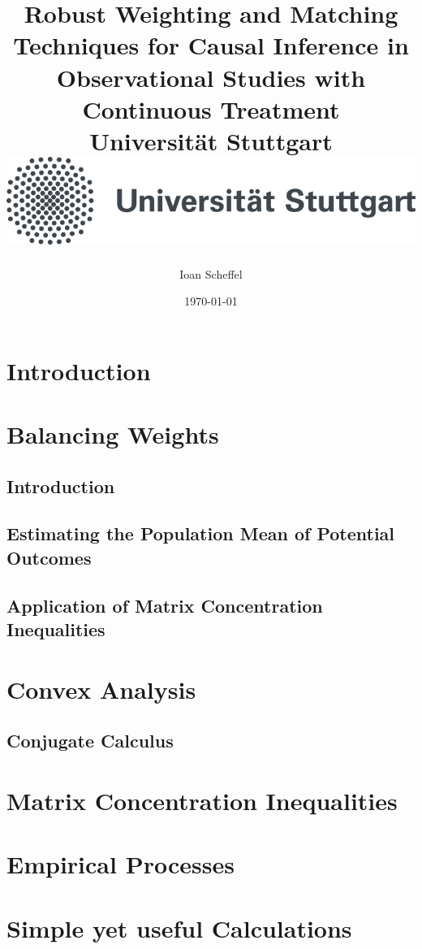 \documentclass[12pt]{scrreport}
\title{
  {
    Robust Weighting and Matching Techniques for Causal Inference in Observational Studies with Continuous Treatment
  }
  \\
  {\large Universität Stuttgart}
  \\
  {\includegraphics{unistuttgart_logo_deutsch.jpg}}
}
\author{Ioan Scheffel}
\date{\today}
\begin{document}
\maketitle

\tableofcontents 

\chapter{Introduction}


\chapter{Balancing Weights}
  \section{Introduction}
  
  \section{Estimating the Population Mean of Potential Outcomes}
  \section{Application of Matrix Concentration Inequalities}
  
\chapter{Convex Analysis}
  \section{Conjugate Calculus}
  
%

\chapter{Matrix Concentration Inequalities}


\chapter{Empirical Processes}


\chapter{Simple yet useful Calculations} 



\printnomenclature

{}

\end{document}
